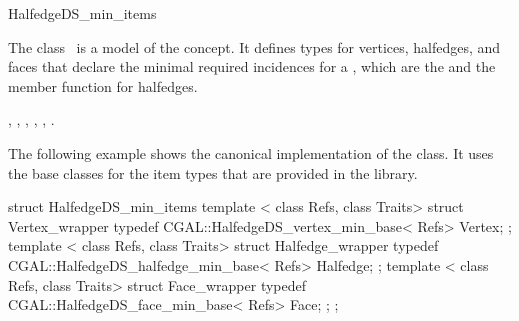 
\ccRefPageBegin



\begin{ccRefClass}{HalfedgeDS_min_items}

\ccDefinition
  
The class \ccRefName\ is a model of the 
concept.  It defines types for vertices, halfedges, and faces that
declare the minimal required incidences for a , which
are the  and the  member function for
halfedges.


\ccIsModel


\ccSeeAlso

,
,
,
,
,
.

\ccExample


The following example shows the canonical implementation of the
 class. It uses the base classes for the
item types that are provided in the library.

\begin{ccExampleCode}
struct HalfedgeDS_min_items {
    template < class Refs, class Traits>
    struct Vertex_wrapper {
        typedef CGAL::HalfedgeDS_vertex_min_base< Refs> Vertex;
    };
    template < class Refs, class Traits>
    struct Halfedge_wrapper {
        typedef CGAL::HalfedgeDS_halfedge_min_base< Refs> Halfedge;
    };
    template < class Refs, class Traits>
    struct Face_wrapper {
        typedef CGAL::HalfedgeDS_face_min_base< Refs> Face;
    };
};
\end{ccExampleCode}

\end{ccRefClass}

\ccRefPageEnd

